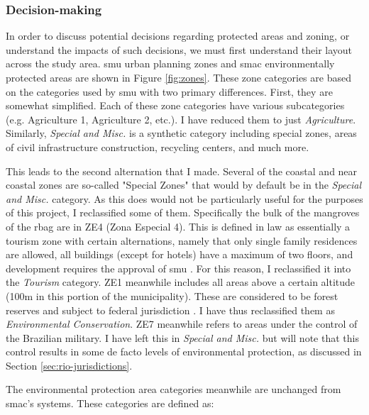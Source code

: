 \subsubsection{Decision-making} \label{sec:rio-evdt-decision-results}

In order to discuss potential decisions regarding protected areas and zoning, or understand the impacts of such decisions, we must first understand their layout across the study area. \ac{smu} urban planning zones \cite{institutopereirapassosAreasProtegidas2021} and \ac{smac} environmentally protected areas \cite{institutopereirapassosSetores2022} are shown in Figure \ref{fig:zones}. These zone categories are based on the categories used by \ac{smu} with two primary differences. First, they are somewhat simplified. Each of these zone categories have various subcategories (e.g. Agriculture 1, Agriculture 2, etc.). I have reduced them to just \textit{Agriculture}. Similarly, \textit{Special and Misc.} is a synthetic category including special zones, areas of civil infrastructure construction, recycling centers, and much more. 

This leads to the second alternation that I made. Several of the coastal and near coastal zones are so-called "Special Zones" that would by default be in the \textit{Special and Misc.} category. As this does would not be particularly useful for the purposes of this project, I reclassified some of them. Specifically the bulk of the mangroves of the \ac{rbag} are in ZE4 (Zona Especial 4). This is defined in law as essentially a tourism zone with certain alternations, namely that only single family residences are allowed, all buildings (except for hotels) have a maximum of two floors, and development requires the approval of \ac{smu} \cite{prefeitodacidadedoriodejaneiroDecretoNo3221976}. For this reason, I reclassified it into the \textit{Tourism} category. ZE1 meanwhile includes all areas above a certain altitude (100m in this portion of the municipality). These are considered to be forest reserves and subject to federal jurisdiction \cite{prefeitodacidadedoriodejaneiroDecretoNo3221976}. I have thus reclassified them as \textit{Environmental Conservation}. ZE7 meanwhile refers to areas under the control of the Brazilian military. I have left this in \textit{Special and Misc.} but will note that this control results in some de facto levels of environmental protection, as discussed in Section \ref{sec:rio-jurisdictions}.

The environmental protection area categories meanwhile are unchanged from \ac{smac}'s systems. These categories are defined as:

